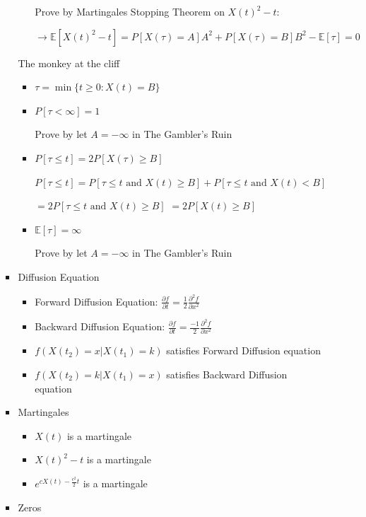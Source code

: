 \documentclass[a4paper]{article}
\begin{document}
\begin{itemize}
\begin{itemize}
\begin{itemize}
\begin{itemize}
                                    Prove by Martingales Stopping Theorem on $X(t)^2 - t$:

                                    $\rightarrow \mathbb{E}[X(t)^2 - t] = P[X(\tau) = A]A^2 + P[X(\tau) = B]B^2 - \mathbb{E}[\tau] = 0$
                            \end{itemize}
                            The monkey at the cliff
                            \begin{itemize}
                                \item $\tau = \min\{t \geq 0: X(t) = B\}$
                                \item $P[\tau < \infty] = 1$

                                    Prove by let $A = -\infty$ in The Gambler's Ruin
                                \item $P[\tau \leq t] = 2 P[X(\tau) \geq B]$

                                    $P[\tau \leq t] = P[\tau \leq t \text{ and } X(t) \geq B] + P[\tau \leq t \text{ and } X(t) < B]$

                                    $= 2 P[\tau \leq t \text{ and } X(t) \geq B]$
                                    $= 2 P[X(t) \geq B]$
                                \item $\mathbb{E}[\tau] = \infty$

                                    Prove by let $A = -\infty$ in The Gambler's Ruin
                            \end{itemize}
                    \item Diffusion Equation
                        \begin{itemize}
                            \item Forward Diffusion Equation: $\frac{\partial f}{\partial t} = \frac{1}{2} \frac{\partial^2 f}{\partial x^2}$
                            \item Backward Diffusion Equation: $\frac{\partial f}{\partial t} = \frac{-1}{2} \frac{\partial^2 f}{\partial x^2}$
                            \item $f(X(t_2) = x| X(t_1) = k)$ satisfies Forward Diffusion equation
                            \item $f(X(t_2) = k| X(t_1) = x)$ satisfies Backward Diffusion equation
                        \end{itemize}
                    \item Martingales
                        \begin{itemize}
                            \item $X(t)$ is a martingale
                            \item $X(t)^2 - t$ is a martingale
                            \item $e^{cX(t) - \frac{c^2}{2}t}$ is a martingale
                        \end{itemize}
                    \item Zeros


\end{itemize}
\end{itemize}
\end{itemize}
\end{document}
